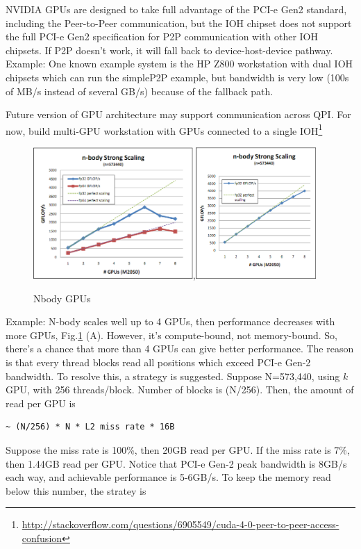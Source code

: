 \begin{framed}
NVIDIA GPUs are designed to take full advantage of the PCI-e Gen2 standard,
including the Peer-to-Peer communication, but the IOH chipset does not support
the full PCI-e Gen2 specification for P2P communication with other IOH chipsets.
If P2P doesn't work, it will fall back to device-host-device pathway.
Example: One known example system is the HP Z800 workstation with dual IOH
chipsets which can run the simpleP2P example, but bandwidth is very low (100s of MB/s instead
of several GB/s) because of the fallback path. 

Future version of GPU architecture may support communication across QPI. For
now, build multi-GPU workstation with GPUs connected to a single
IOH\footnote{\url{http://stackoverflow.com/questions/6905549/cuda-4-0-peer-to-peer-access-confusion}}

\end{framed}


\begin{figure}[hbt]
  \centerline{\includegraphics[height=5cm,
    angle=0]{./images/Nbody_GPUs.eps},\includegraphics[height=5cm,
    angle=0]{./images/Nbody_GPUs_new.eps} }
\caption{Nbody GPUs}
\label{fig:Nbody_GPUs}
\end{figure}

Example: N-body scales well up to 4 GPUs, then performance decreases with more
GPUs, Fig.\ref{fig:Nbody_GPUs} (A). However, it's compute-bound, not
memory-bound. So, there's a chance that more than 4 GPUs can give better performance. The reason is that every thread
blocks read all positions which exceed PCI-e Gen-2 bandwidth. To resolve this, a
strategy is suggested. Suppose N=573,440, using $k$ GPU, with 256 threads/block.
Number of blocks is (N/256). Then, the amount of read per GPU is 
\begin{verbatim}
~ (N/256) * N * L2 miss rate * 16B
\end{verbatim}
Suppose the miss rate is 100\%, then 20GB read per GPU. If the miss rate is 7\%,
then 1.44GB read per GPU. Notice that PCI-e Gen-2 peak bandwidth is 8GB/s each
way, and achievable performance is 5-6GB/s. To keep the memory read below this
number, the stratey is

